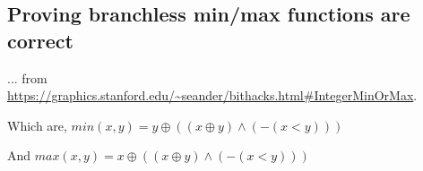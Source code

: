 \subsection{Proving branchless min/max functions are correct}

... from \url{https://graphics.stanford.edu/~seander/bithacks.html#IntegerMinOrMax}.

Which are, $min(x,y) = y \oplus ((x \oplus y) \wedge (-(x < y)))$

And $max(x,y) = x \oplus ((x \oplus y) \wedge (-(x < y)))$





